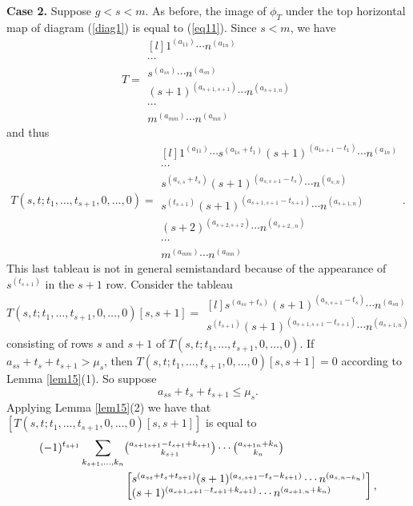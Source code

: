 \textbf{Case 2.} Suppose $g<s<m.$ As before, the image of $\phi_T$ under the top horizontal map of diagram (\ref{diag1}) is equal to (\ref{eq11}). Since $s<m$, we have \begin{equation}T= \begin{matrix*}[l]
		1^{(a_{11})} \cdots n^{(a_{1n})} \\
		\cdots \\ 
		s^{(a_{ss})} \cdots n^{(a_{sn})} \\
		(s+1)^{(a_{s+1,s+1})} \cdots n^{(a_{s+1,n})}\\
		\cdots\\
		m^{(a_{mm})} \cdots n^{(a_{mn})}  \end{matrix*}\end{equation}
and thus 
\begin{equation*}\label{case21}T(s,t;t_1,\dots,t_{s+1},0,\dots,0)= \begin{matrix*}[l]
		1^{(a_{11})} \cdots s^{(a_{1s}+t_1)}(s+1)^{(a_{1s+1}-t_1)} \cdots n^{(a_{1n})} \\
		\cdots \\ 
		s^{(a_{s,s}+t_s)}(s+1)^{(a_{s,s+1}-t_s)} \cdots n^{(a_{s,n})} \\
		s^{(t_{s+1})}(s+1)^{(a_{s+1,s+1}-t_{s+1})} \cdots n^{(a_{s+1,n})}\\
		(s+2)^{(a_{s+2,s+2})}\cdots n^{(a_{s+2,,n})} \\
		\cdots\\
		m^{(a_{mm})} \cdots n^{(a_{mn})}  \end{matrix*}.\end{equation*}
	This last tableau is not in general semistandard because of the appearance of $s^{(t_{s+1})}$ in the $s+1$ row. Consider the tableau \begin{equation}\label{eq117}T(s,t;t_1,\dots,t_{s+1},0,\dots,0)[s,s+1]=\begin{matrix*}[l] 
			s^{(a_{ss}+t_s)}(s+1)^{(a_{s,s+1}-t_s)} \cdots n^{(a_{sn})} \\
			s^{(t_{s+1})}(s+1)^{(a_{s+1,s+1}-t_{s+1})} \cdots n^{(a_{s+1,n})} \end{matrix*} \end{equation} consisting of rows $s$ and $s+1$ of $T(s,t;t_1,\dots,t_{s+1},0,\dots,0)$. If $a_{ss}+t_s+t_{s+1} > \mu_s$, then $T(s,t;t_1,\dots,t_{s+1},0,\dots,0)[s,s+1]=0$ according to Lemma \ref{lem15}(1). So suppose \begin{equation}\label{case2n1}a_{ss}+t_s+t_{s+1} \le \mu_s.\end{equation} Applying Lemma \ref{lem15}(2) we have that $[T(s,t;t_1,\dots,t_{s+1},0,\dots,0)[s,s+1]]$ is equal to \begin{align*}
		(-1)^{t_{s+1}}\sum_{k_{s+1},\dots,k_n}&\tbinom{a_{s+1s+1}-t_{s+1}+k_{s+1}}{k_{s+1}}\cdots\tbinom{a_{s+1n}+k_n}{k_n}\\
		&\begin{bmatrix*}[l] 
			s^{(a_{ss}+t_s+t_{s+1})}(s+1)^{(a_{s,s+1}-t_s-k_{s+1})} \cdots n^{(a_{s,n-k_n})} \\
			(s+1)^{(a_{s+1,s+1}-t_{s+1}+k_{s+1})} \cdots n^{(a_{s+1,n}+k_n)} \end{bmatrix*},
	\end{align*} 
